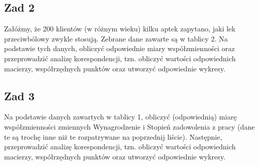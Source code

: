 \documentclass[12pt]{mwart}\usepackage[]{graphicx}\usepackage[]{color}
\begin{document}
\subsection*{Zad 2}
Załóżmy, że 200 klientów (w różnym wieku) kilku aptek zapytano, jaki lek przeciwbólowy zwykle stosują. Zebrane dane zawarte są w tablicy 2. Na podstawie tych danych, obliczyć odpowiednie miary współzmienności oraz przeprowadzić analizę korespondencji, tzn. obliczyć wartości odpowiednich macierzy, współrzędnych punktów
oraz utworzyć odpowiednie wykresy.

\subsection*{Zad 3}
Na podstawie danych zawartych w tablicy 1, obliczyć (odpowiednią) miarę współzmienności zmiennych Wynagrodzenie i Stopień zadowolenia z pracy (dane te są trochę inne niż te rozpatrywane na poprzednij liście). Następnie, przeprowadzić analizę korespondencji, tzn. obliczyć wartości odpowiednich macierzy, współrzędnych punktów oraz utworzyć odpowiednie wykresy.
\end{document}
